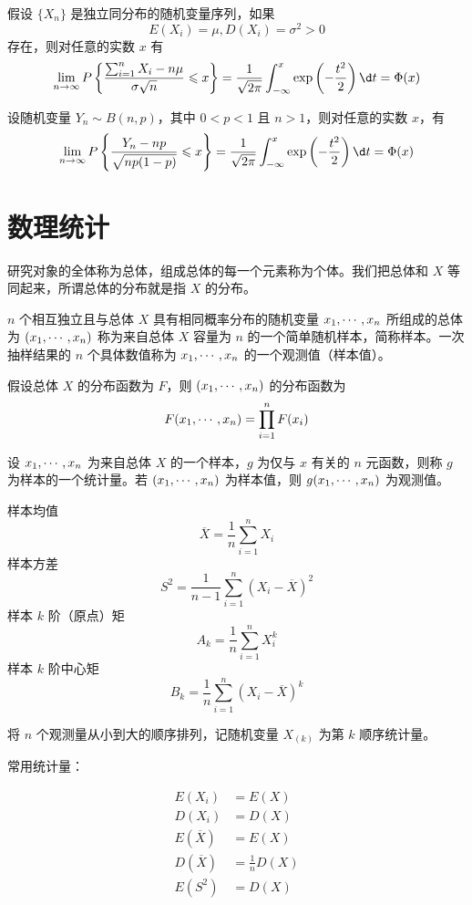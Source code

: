\begin{theorem}[列维 - 林德伯格定理]
	假设 $\{X_n\}$ 是独立同分布的随机变量序列，如果
	\[ E(X_i) = \mu, D(X_i) = \sigma^2 > 0 \]
	存在，则对任意的实数 $x$ 有
	\[ \lim_{n \to \infty} P\left\{ \frac{\sum_{i=1}^n X_i - n \mu}{\sigma \sqrt{n}} \leqslant x \right\} = \frac{1}{\sqrt{2 \pi}} \int_{-\infty}^x \exp\left(-\frac{t^2}{2}\right) \d t = \Phi(x)  \]
\end{theorem}

\begin{theorem}
	设随机变量 $Y_n \sim B(n, p)$，其中 $0 < p < 1$ 且 $n > 1$，则对任意的实数 $x$，有
	\[ \lim_{n \to \infty} P\left\{ \frac{Y_n - np}{\sqrt{np(1 - p)}} \leqslant x \right\} = \frac{1}{\sqrt{2 \pi}} \int_{-\infty}^x \exp\left(-\frac{t^2}{2}\right) \d t = \Phi(x)  \]
\end{theorem}

\section{数理统计}

研究对象的全体称为总体，组成总体的每一个元素称为个体。我们把总体和 $X$ 等同起来，所谓总体的分布就是指 $X$ 的分布。

$n$ 个相互独立且与总体 $X$ 具有相同概率分布的随机变量 $x_1,\cdots,x_n$ 所组成的总体为 $(x_1,\cdots,x_n)$ 称为来自总体 $X$ 容量为 $n$ 的一个简单随机样本，简称样本。一次抽样结果的 $n$ 个具体数值称为 $x_1,\cdots,x_n$ 的一个观测值（样本值）。

假设总体 $X$ 的分布函数为 $F$，则 $(x_1,\cdots,x_n)$ 的分布函数为
\[ F(x_1,\cdots,x_n) = \prod_{i=1}^n F(x_i) \]

设 $x_1,\cdots,x_n$ 为来自总体 $X$ 的一个样本，$g$ 为仅与 $x$ 有关的 $n$ 元函数，则称 $g$ 为样本的一个统计量。若 $(x_1,\cdots,x_n)$ 为样本值，则 $g(x_1,\cdots,x_n)$ 为观测值。

样本均值
\[ \overline{X} = \frac{1}{n} \sum_{i=1}^n X_i \]
样本方差
\[ S^2 = \frac{1}{n-1} \sum_{i=1}^n (X_i - \overline{X})^2 \]
样本 $k$ 阶（原点）矩
\[ A_k = \frac{1}{n} \sum_{i=1}^n X_i^k \]
样本 $k$ 阶中心矩
\[ B_k = \frac{1}{n} \sum_{i=1}^n (X_i - \overline{X})^k \]

将 $n$ 个观测量从小到大的顺序排列，记随机变量 $X_{(k)}$ 为第 $k$ 顺序统计量。

常用统计量：

\[
	\begin{aligned}
		E(X_i)          & = E(X)             \\
		D(X_i)          & = D(X)             \\
		E(\overline{X}) & = E(X)             \\
		D(\overline{X}) & = \frac{1}{n} D(X) \\
		E(S^2)          & = D(X)
	\end{aligned}
\]

